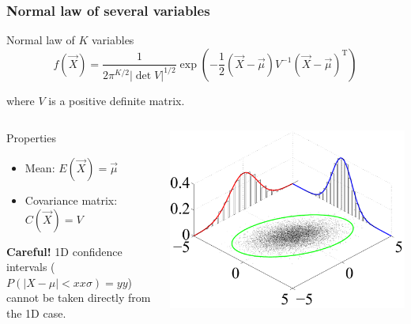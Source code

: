 \documentclass[9pt]{beamer}
\newif\ifmynote
\newcommand\mynote[1]{%
\ifmynote \textbf{#1} \else \fi
}
\begin{document}
\begin{frame}
 \frametitle{Normal law of several variables}
 
 \mynote{Écrire au tableau}
 
 \begin{block}{Normal law of $K$ variables}
  $$f(\vec{X}) = \frac{1}{2\pi^{K/2} |\det V|^{1/2}} \exp \left( -\frac{1}{2} \left(\vec{X}-\vec{\mu}\right) V^{-1}  \left(\vec{X}-\vec{\mu}\right)^\text{T} \right)$$
  
  where $V$ is a positive definite matrix.
 \end{block}
 
 \begin{columns}
  \begin{column}{0.6\textwidth}
   
 
 \begin{block}{Properties}
  \begin{itemize}
   \item Mean: $E(\vec{X}) = \vec{\mu}$
   \item Covariance matrix: $C(\vec{X}) = V$
  \end{itemize}
 \end{block}
 
  \textbf{Careful!} 1D confidence intervals ($P(|X-\mu|<xx\sigma) = yy$) cannot be taken directly from the 1D case.
  \end{column}
  \begin{column}{0.4\textwidth}
   \includegraphics[width=\textwidth]{../figures/Multivariate_normal_sample.pdf}
  \end{column}

 \end{columns}
 
\end{frame}
\end{document}
